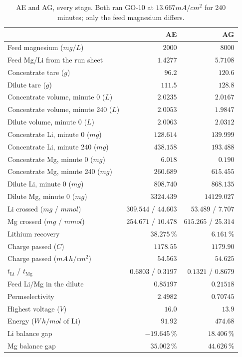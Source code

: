 \begin{table}[htbp]
\centering
\caption{AE and AG, every stage. Both ran GO-10 at $13.667\unit{mA/cm^2}$ for 240 minutes;
only the feed magnesium differs.}
\label{tab:ae-ag}
\begin{tabular}{lrr}
\toprule
 & AE & AG \\
\midrule
Feed magnesium ($\unit{mg/L}$)          & $2000$ & $8000$ \\
Feed Mg/Li from the run sheet           & $1.4277$ & $5.7108$ \\
\addlinespace
Concentrate tare ($\unit{g}$)           & $96.2$ & $120.6$ \\
Dilute tare ($\unit{g}$)                & $111.5$ & $128.8$ \\
Concentrate volume, minute 0 ($\unit{L}$)   & $2.0235$ & $2.0167$ \\
Concentrate volume, minute 240 ($\unit{L}$) & $2.0053$ & $1.9847$ \\
Dilute volume, minute 0 ($\unit{L}$)        & $2.0063$ & $2.0312$ \\
\addlinespace
Concentrate Li, minute 0 ($\unit{mg}$)   & $128.614$ & $139.999$ \\
Concentrate Li, minute 240 ($\unit{mg}$) & $438.158$ & $193.488$ \\
Concentrate Mg, minute 0 ($\unit{mg}$)   & $6.018$ & $0.190$ \\
Concentrate Mg, minute 240 ($\unit{mg}$) & $260.689$ & $615.455$ \\
Dilute Li, minute 0 ($\unit{mg}$)        & $808.740$ & $868.135$ \\
Dilute Mg, minute 0 ($\unit{mg}$)        & $3324.439$ & $14129.027$ \\
\addlinespace
Li crossed ($\unit{mg}$ / $\unit{mmol}$) & $309.544$ / $44.603$ & $53.489$ / $7.707$ \\
Mg crossed ($\unit{mg}$ / $\unit{mmol}$) & $254.671$ / $10.478$ & $615.265$ / $25.314$ \\
\addlinespace
Lithium recovery                         & $38.275\,\%$ & $6.161\,\%$ \\
Charge passed ($\unit{C}$)               & $1178.55$ & $1179.90$ \\
Charge passed ($\unit{mA\,h/cm^2}$)      & $54.563$ & $54.625$ \\
$t_{\mathrm{Li}}$ / $t_{\mathrm{Mg}}$    & $0.6803$ / $0.3197$ & $0.1321$ / $0.8679$ \\
Feed Li/Mg in the dilute                 & $0.85197$ & $0.21518$ \\
Permselectivity                          & $2.4982$ & $0.70745$ \\
\addlinespace
Highest voltage ($\unit{V}$)             & $16.0$ & $13.9$ \\
Energy ($\unit{W\,h/mol}$ of Li)         & $91.92$ & $474.68$ \\
Li balance gap                           & $-19.645\,\%$ & $18.406\,\%$ \\
Mg balance gap                           & $35.002\,\%$ & $44.626\,\%$ \\
\bottomrule
\end{tabular}
\end{table}

